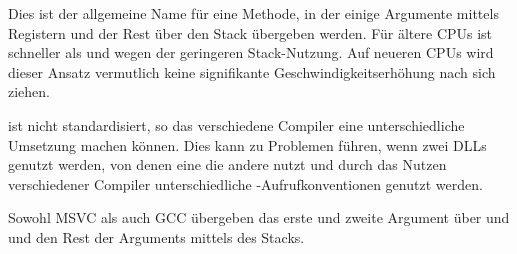 Dies ist der allgemeine Name für eine Methode, in der einige Argumente mittels Registern und
der Rest über den Stack übergeben werden. Für ältere CPUs ist  schneller als
 und  wegen der geringeren Stack-Nutzung.
Auf neueren \ac{CPU}s wird dieser Ansatz vermutlich keine signifikante Geschwindigkeitserhöhung
nach sich ziehen.

 ist nicht standardisiert, so das verschiedene Compiler eine unterschiedliche
Umsetzung machen können.
Dies kann zu Problemen führen, wenn zwei DLLs genutzt werden, von denen eine die andere nutzt
und durch das Nutzen verschiedener Compiler unterschiedliche -Aufrufkonventionen
genutzt werden.

Sowohl MSVC als auch GCC übergeben das erste und zweite Argument über \ECX und \EDX und den Rest
der Arguments mittels des Stacks.

